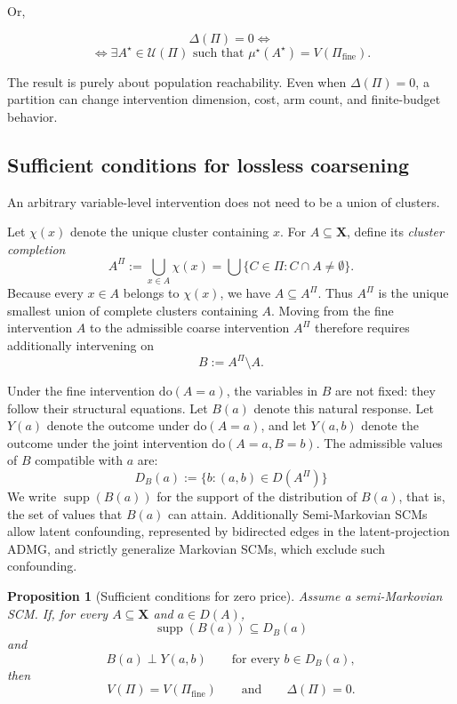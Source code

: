 \documentclass[twoside]{article}
\newtheorem{proposition}{Proposition}
\newcommand{\doo}{\mathrm{do}}
\begin{document}
Or,

\[
\Delta(\Pi)=0
\iff 
\]
\[\iff \exists A^\star\in\mathcal U(\Pi)
\text{ such that }
\mu^\star(A^\star)=V(\Pi_{\mathrm{fine}}).
\]


The result is purely about population reachability. Even when $\Delta(\Pi)=0$, a partition can change intervention dimension, cost, arm count, and finite-budget behavior.

\subsection{Sufficient conditions for lossless coarsening}
\label{sec:zero-price}

An arbitrary variable-level intervention does not need to be a union of clusters. 

Let $\chi(x)$ denote the unique cluster containing $x$. For $A\subseteq\mathbf X$, define its \emph{cluster completion}
\[
A^\Pi
:=
\bigcup_{x\in A}\chi(x)
=
  \bigcup\{C\in\Pi:C\cap A\neq\emptyset\}.
\]
Because every $x\in A$ belongs to $\chi(x)$, we have $A\subseteq A^\Pi$. Thus $A^\Pi$ is the unique smallest union of complete clusters containing $A$. Moving from the fine intervention $A$ to the admissible coarse intervention $A^\Pi$ therefore requires additionally intervening on
\[
  B:=A^\Pi\setminus A.
\]

Under the fine intervention $\doo(A=a)$, the variables in $B$ are not fixed: 
they follow their structural equations. Let $B(a)$ denote this natural response. Let $Y(a)$ denote the outcome under $\doo(A=a)$, and let $Y(a,b)$ denote the outcome under the joint intervention $\doo(A=a,B=b)$. The admissible values of $B$ compatible with $a$ are:
\[
  D_B(a):=\{b:(a,b)\in D(A^\Pi)\}
\]
We write $\operatorname{supp}(B(a))$ for the support of the distribution of $B(a)$, that is, the set of values that $B(a)$ can attain. Additionally Semi-Markovian SCMs allow latent confounding, represented by bidirected edges in the latent-projection ADMG, and strictly generalize Markovian SCMs, which exclude such confounding.

\begin{proposition}[Sufficient conditions for zero price]
\label{prop:free}
Assume a semi-Markovian SCM. If, for every $A\subseteq\mathbf X$ and
$a\in D(A)$,
\[
  \operatorname{supp}(B(a))\subseteq D_B(a)
\]
and
\[
  B(a)\perp Y(a,b)
  \qquad\text{for every }b\in D_B(a),
\]
then 
\[
V(\Pi)=V(\Pi_{\mathrm{fine}})
\qquad\text{and}\qquad
\Delta(\Pi)=0.
\]
\end{proposition}
\end{document}
